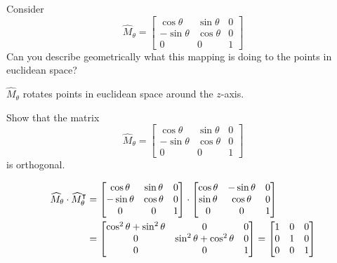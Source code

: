 \documentclass{ximera}
\begin{document}
\begin{problem}
  Consider
  \[
  \hat{M}_\theta=\begin{bmatrix}
  \cos\theta & \sin\theta & 0\\
  -\sin\theta & \cos\theta & 0\\
  0 & 0 & 1
  \end{bmatrix}
  \]
  Can you describe geometrically what this mapping is doing
  to the points in euclidean space?


\begin{freeResponse}
$\hat{M}_\theta$ rotates points in euclidean space around the $z$-axis. 
\end{freeResponse}
\end{problem}


\begin{problem}
\label{14} Show that the matrix%
\[
\hat{M}_\theta=\begin{bmatrix}
\cos\theta & \sin\theta & 0\\
-\sin\theta & \cos\theta & 0\\
0 & 0 & 1
\end{bmatrix}
\]
is orthogonal. 

\begin{freeResponse}
\begin{align*}
\widehat{M}_\theta \cdot \widehat{M}_\theta^\intercal 
	&= \begin{bmatrix}
	\cos\theta & \sin\theta & 0 \\
	-\sin\theta & \cos\theta & 0 \\
	0 & 0 & 1
	\end{bmatrix} \cdot
	\begin{bmatrix}
	\cos\theta & -\sin\theta & 0 \\
	\sin\theta & \cos\theta & 0 \\
	0 & 0 & 1
	\end{bmatrix} \\
	&= \begin{bmatrix}
	\cos^{2}\theta + \sin^{2} \theta & 0 & 0 \\
	0 &  \sin^{2} \theta + \cos^{2}\theta  & 0 \\
	0 & 0 & 1
	\end{bmatrix}
	=  \begin{bmatrix}
	1 & 0 & 0 \\
	0 & 1  & 0 \\
	0 & 0 & 1
	\end{bmatrix}
\end{align*}
\end{freeResponse}
\end{problem}
\end{document}
